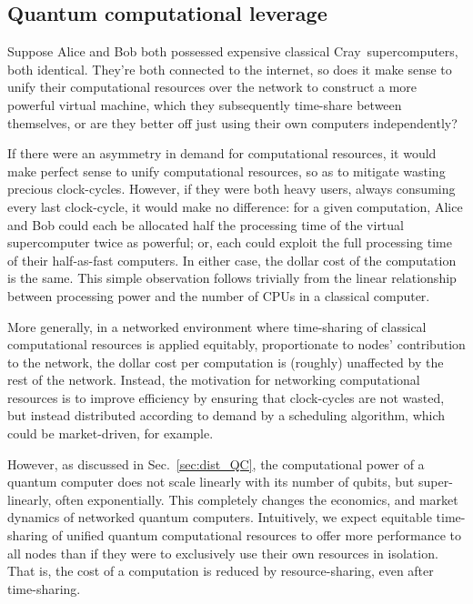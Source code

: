 %
%

\subsection{Quantum computational leverage}\label{sec:quant_ec_lev}

Suppose Alice and Bob both possessed expensive classical Cray\texttrademark\, supercomputers, both identical. They're both connected to the internet, so does it make sense to unify their computational resources over the network to construct a more powerful virtual machine, which they subsequently time-share between themselves, or are they better off just using their own computers independently?

If there were an asymmetry in demand for computational resources, it would make perfect sense to unify computational resources, so as to mitigate wasting precious clock-cycles. However, if they were both heavy users, always consuming every last clock-cycle, it would make no difference: for a given computation, Alice and Bob could each be allocated half the processing time of the virtual supercomputer twice as powerful; or, each could exploit the full processing time of their half-as-fast computers. In either case, the dollar cost of the computation is the same. This simple observation follows trivially from the linear relationship between processing power and the number of CPUs in a classical computer.

More generally, in a networked environment where time-sharing of classical computational resources is applied equitably, proportionate to nodes' contribution to the network, the dollar cost per computation is (roughly) unaffected by the rest of the network. Instead, the motivation for networking computational resources is to improve efficiency by ensuring that clock-cycles are not wasted, but instead distributed according to demand by a scheduling algorithm, which could be market-driven, for example.

However, as discussed in Sec.~\ref{sec:dist_QC}, the computational power of a quantum computer does not scale linearly with its number of qubits, but super-linearly, often exponentially. This completely changes the economics, and market dynamics of networked quantum computers. Intuitively, we expect equitable time-sharing of unified quantum computational resources to offer more performance to all nodes than if they were to exclusively use their own resources in isolation. That is, the cost of a computation is reduced by resource-sharing, even after time-sharing.

